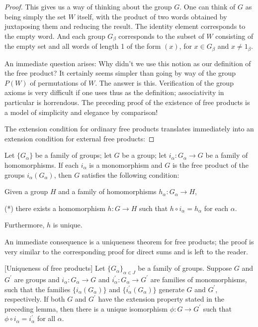 \begin{proof}
This gives us a way of thinking about the group \(G\). One can think of \(G\) as being simply the set \(W\) itself, with the product of two words obtained by juxtaposing them and reducing the result. The identity element corresponds to the empty word. And each group \(G_{\beta }\) corresponds to the subset of \(W\) consisting of the empty set and all words of length 1 of the form \((x)\), for \(x \in {G}_{\beta }\) and \(x \neq {1}_{\beta }\).

An immediate question arises: Why didn't we use this notion as our definition of the free product? It certainly seems simpler than going by way of the group \(P( W)\) of permutations of \(W\). The answer is this. Verification of the group axioms is very difficult if one uses thus as the definition; associativity in particular is horrendous. The preceding proof of the existence of free products is a model of simplicity and elegance by comparison!

The extension condition for ordinary free products translates immediately into an extension condition for external free products:
\end{proof}
\begin{lemma}
\label{lem:\thetheorem}
Let \(\{ G_{\alpha }\}\) be a family of groups; let \(G\) be a group; let \(i_{\alpha } : G_{\alpha } \rightarrow G\) be a family of homomorphisms. If each \(i_{\alpha }\) is a monomorphism and \(G\) is the free product of the groups \(i_{\alpha }( G_{\alpha })\), then \(G\) satisfies the following condition:

Given a group \(H\) and a family of homomorphisms \(h_{\alpha } : G_{\alpha } \rightarrow H\),

(*) there exists a homomorphism \(h : G \rightarrow H\) such that \(h \circ {i}_{\alpha } = h_{\alpha }\) for each \(\alpha\).

Furthermore, \(h\) is unique.
\end{lemma}

An immediate consequence is a uniqueness theorem for free products; the proof is very similar to the corresponding proof for direct sums and is left to the reader.

\begin{theorem}
\label{thm:\thetheorem}[Uniqueness of free products]
Let \({\{ G_{\alpha }\} }_{\alpha \in J}\) be a family of groups. Suppose \(G\) and \(G^{\prime }\) are groups and \(i_{\alpha } : G_{\alpha } \rightarrow G\) and \(i_{\alpha }^{\prime } : G_{\alpha } \rightarrow {G}^{\prime }\) are families of monomorphisms, such that the families \(\{ {i_{\alpha }( G_{\alpha }) }\}\) and \(\{ {i_{\alpha }^{\prime }( G_{\alpha }) }\}\) generate \(G\) and \(G^{\prime }\), respectively. If both \(G\) and \(G^{\prime }\) have the extension property stated in the preceding lemma, then there is a unique isomorphism \(\phi : G \rightarrow {G}^{\prime }\) such that \(\phi \circ {i}_{\alpha } = i_{\alpha }^{\prime }\) for all \(\alpha\).
\end{theorem}

